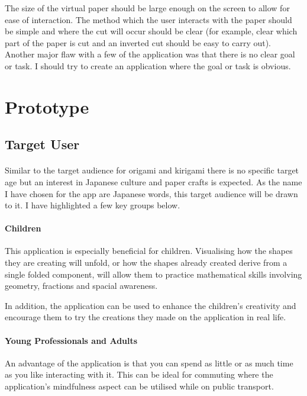 \documentclass[11pt]{article}
\begin{document}
            The size of the virtual paper should be large enough on the screen to allow for ease of interaction. The method which the user interacts with the paper should be simple and where the cut will occur should be clear (for example, clear which part of the paper is cut and an inverted cut should be easy to carry out). Another major flaw with a few of the application was that there is no clear goal or task. I should try to create an application where the goal or task is obvious.


\newpage
\section{Prototype}

    \subsection{Target User}
    
            \paragraph{}
            Similar to the target audience for origami and kirigami there is no specific target age but an interest in Japanese culture and paper crafts is expected. As the name I have chosen for the app are Japanese words, this target audience will be drawn to it. I have highlighted a few key groups below. 
            
            \paragraph{Children}
            This application is especially beneficial for children. Visualising how the shapes they are creating will unfold, or how the shapes already created derive from a single folded component, will allow them to practice mathematical skills involving geometry, fractions and spacial awareness.
            
            In addition, the application can be used to enhance the children's creativity and encourage them to try the creations they made on the application in real life. 
            
            \paragraph{Young Professionals and Adults}
            An advantage of the application is that you can spend as little or as much time as you like interacting with it. This can be ideal for commuting where the application's mindfulness aspect can be utilised while on public transport.
\end{document}
